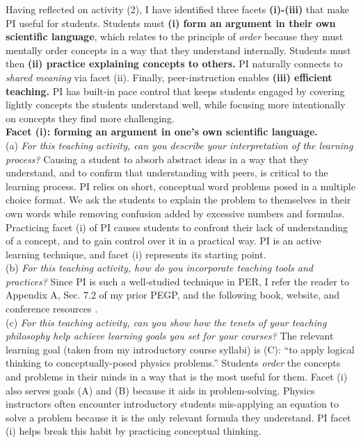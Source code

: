\documentclass[../../../main.tex]{subfiles}
\begin{document}
Having reflected on activity (2), I have identified three facets \textbf{(i)-(iii)} that make PI useful for students.  Students must \textbf{(i) form an argument in their own scientific language}, which relates to the principle of \textit{order} because they must mentally order concepts in a way that they understand internally.  Students must then \textbf{(ii) practice explaining concepts to others.}  PI naturally connects to \textit{shared meaning} via facet (ii).  Finally, peer-instruction enables \textbf{(iii) efficient teaching.}  PI has built-in pace control that keeps students engaged by covering lightly concepts the students understand well, while focusing more intentionally on concepts they find more challenging.
\\
\vspace{0.25cm}
\textbf{Facet (i): forming an argument in one's own scientific language.}
\\
\vspace{0.25cm}
(a) \textit{For this teaching activity, can you describe your interpretation of the learning process?}  Causing a student to absorb abstract ideas in a way that they understand, and to confirm that understanding with peers, is critical to the learning process.  PI relies on short, conceptual word problems posed in a multiple choice format.  We ask the students to explain the problem to themselves in their own words while removing confusion added by excessive numbers and formulas.  Practicing facet (i) of PI causes students to confront their lack of understanding of a concept, and to gain control over it in a practical way.  PI is an active learning technique, and facet (i) represents its starting point.
\\
\vspace{0.25cm}
(b) \textit{For this teaching activity, how do you incorporate teaching tools and practices?}  Since PI is such a well-studied technique in PER, I refer the reader to Appendix A, Sec. 7.2 of my prior PEGP, and the following book, website, and conference resources \cite{mazur2013peer,PhysPort,AAPTPI}.
\\
\vspace{0.25cm}
(c) \textit{For this teaching activity, can you show how the tenets of your teaching philosophy help achieve learning goals you set for your courses?}  The relevant learning goal (taken from my introductory course syllabi) is (C): ``to apply logical thinking to conceptually-posed physics problems.''  Students \textit{order} the concepts and problems in their minds in a way that is the most useful for them.  Facet (i) also serves goals (A) and (B) because it aids in problem-solving.  Physics instructors often encounter introductory students mis-applying an equation to solve a problem because it is the only relevant formula they understand.  PI facet (i) helps break this habit by practicing conceptual thinking.
\end{document}
